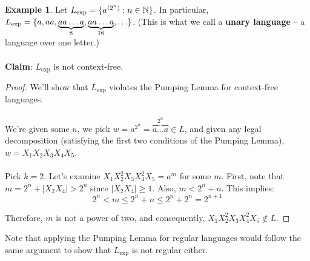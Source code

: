 \documentclass[]{article}
\DeclarePairedDelimiter{\set}{\lbrace}{\rbrace}
\theoremstyle{definition}
\newtheorem{ex}{Example}[section]
\newcommand{\lecture}[1]{\marginpar{{\footnotesize $\leftarrow$ \underline{#1}}}}
\begin{document}
      \begin{ex} \lecture{October 29, 2013}
        Let $L_\text{exp} = \set{a^{(2^n)} : n \in \mathbb{N} }$. In particular, $L_\text{exp} = \set{ a, aa, \underbrace{aa \ldots a}_8, \underbrace{aa \ldots a}_{16}, \ldots }$. (This is what we call a \textbf{unary language} -- a language over one letter.)
        \\ \\
        \textbf{Claim}: $L_\text{exp}$ is not context-free.

        \begin{proof}
          We'll show that $L_\text{exp}$ violates the Pumping Lemma for context-free languages.
          \\ \\
          We're given some $n$, we pick $w = a^{2^n} = \overbrace{a \ldots a}^{2^n} \in L$, and given any legal decomposition (satisfying the first two conditions of the Pumping Lemma), $w = X_1 X_2 X_3 X_4 X_5$.
          \\ \\
          Pick $k = 2$. Let's examine $X_1 X_2^2 X_3 X_4^2 X_5 = a^m$ for some $m$. First, note that $m = 2^n + |X_2 X_4| > 2^n$ since $|X_2 X_4| \ge 1$. Also, $m < 2^n + n$. This implies:
          $$
            2^n < m \le 2^n + n \le 2^n + 2^n = 2^{n + 1}
          $$

          Therefore, $m$ is not a power of two, and consequently, $X_1 X_2^2 X_3 X_4^2 X_5 \not \in L$.
        \end{proof}

        Note that applying the Pumping Lemma for regular languages would follow the same argument to show that $L_\text{exp}$ is not regular either.
      \end{ex}
\end{document}
